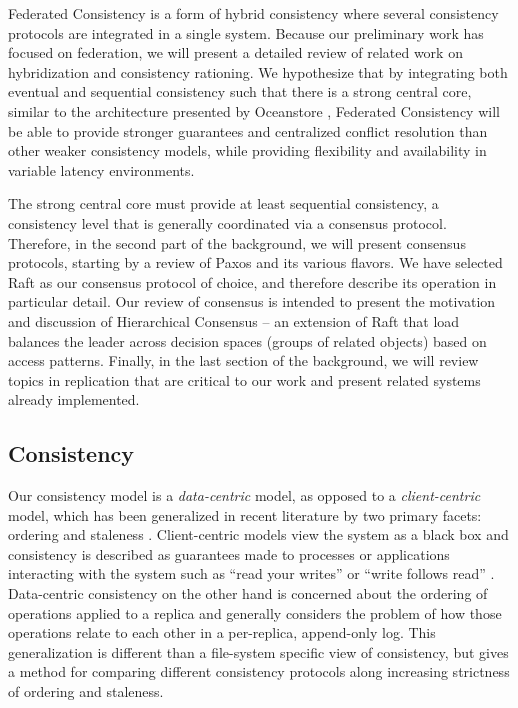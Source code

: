 \documentclass{article}
\begin{document}
Federated Consistency is a form of hybrid consistency where several consistency protocols are integrated in a single system. Because our preliminary work has focused on federation, we will present a detailed review of related work on hybridization and consistency rationing. We hypothesize that by integrating both eventual and sequential consistency such that there is a strong central core, similar to the architecture presented by Oceanstore \cite{kubiatowicz_oceanstore:_2000}, Federated Consistency will be able to provide stronger guarantees and centralized conflict resolution than other weaker consistency models, while providing flexibility and availability in variable latency environments.

The strong central core must provide at least sequential consistency, a consistency level that is generally coordinated via a consensus protocol. Therefore, in the second part of the background, we will present consensus protocols, starting by a review of Paxos \cite{lamport_paxos_2001} and its various flavors. We have selected Raft \cite{ongaro_search_2014} as our consensus protocol of choice, and therefore describe its operation in particular detail. Our review of consensus is intended to present the motivation and discussion of Hierarchical Consensus -- an extension of Raft that load balances the leader across decision spaces (groups of related objects) based on access patterns. Finally, in the last section of the background, we will review topics in replication that are critical to our work and present related systems already implemented.

\subsection{Consistency}
\label{sec:consistency}

Our consistency model is a \textit{data-centric} model, as opposed to a \textit{client-centric} model, which has been generalized in recent literature by two primary facets: ordering and staleness \cite{bermbach_consistency_2013}. Client-centric models view the system as a black box and consistency is described as guarantees made to processes or applications interacting with the system such as ``read your writes'' or ``write follows read'' \cite{vogels_eventually_2009}. Data-centric consistency on the other hand is concerned about the ordering of operations applied to a replica and generally considers the problem of how those operations relate to each other in a per-replica, append-only log. This generalization is different than a file-system specific view of consistency, but gives a method for comparing different consistency protocols along increasing strictness of ordering and staleness.
\end{document}
